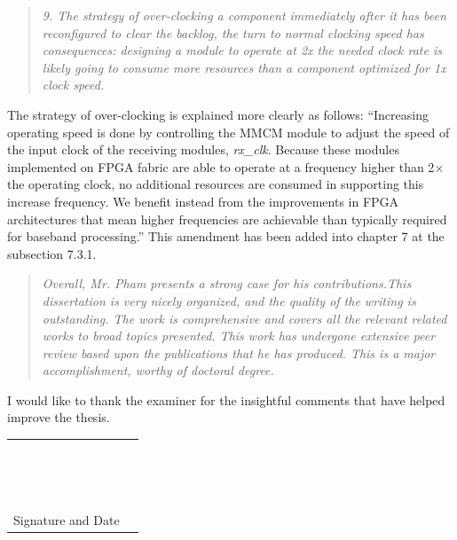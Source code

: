 \documentclass{article}
\begin{document}
\begin{quote}
\emph{9. The strategy of over-clocking a component immediately after it has been reconfigured to clear the backlog, the turn to normal clocking speed has consequences: designing a module to operate at 2x the needed clock rate is likely going to consume more resources than a component optimized for 1x clock speed.}
\end{quote}
The strategy of over-clocking is explained more clearly as follows:
``Increasing operating speed is done by controlling the MMCM module to adjust the speed of the input clock of the receiving modules, \emph{rx\_clk}. Because these modules implemented on FPGA fabric are able to operate at a frequency higher than 2$\times$ the operating clock, no additional resources are consumed in supporting this increase frequency.
We benefit instead from the improvements in FPGA architectures that mean higher frequencies are achievable than typically required for baseband processing.''
This amendment has been added into chapter 7 at the subsection 7.3.1.\newline

\begin{quote}
	\emph{Overall, Mr. Pham presents a strong case for his contributions.This dissertation is very nicely organized, and the quality 	of the writing is outstanding. The work is comprehensive and covers all the relevant related works to broad topics presented. This work has undergone extensive peer review based upon the publications that he has produced. This is a major accomplishment, worthy of doctoral degree.}
\end{quote}

I would like to thank the examiner for the insightful comments that have helped improve the thesis.

\begin{table}[h]
	\begin{tabular}{ll}
		& \\
		& \\
		& \\ 
		& \\
		& \\
		& \\
		& \\
		& \\
		& \\
		& \\
		& \\
		& \\
		& \\
		& \\
		& \\
		
		Signature and Date 
	\end{tabular}
\end{table}
\end{document}
